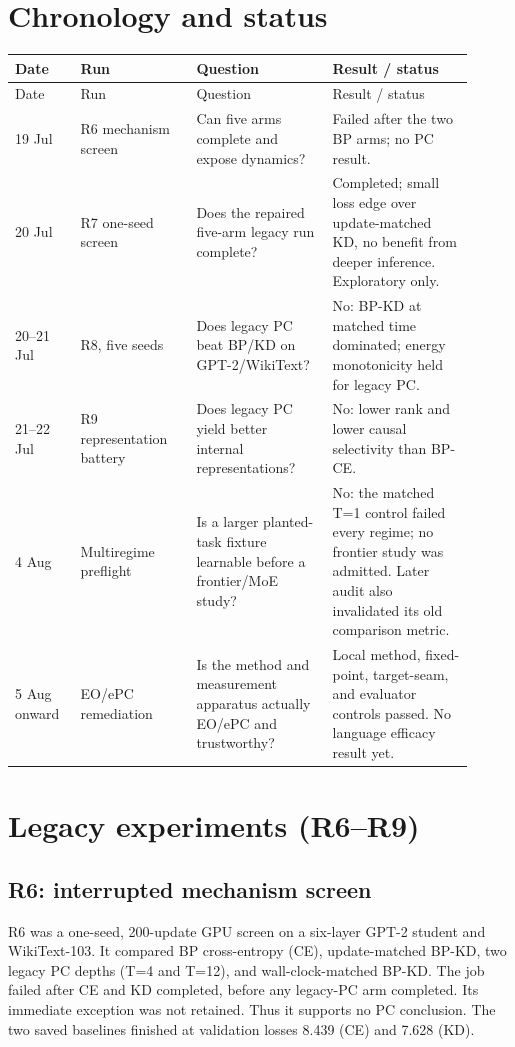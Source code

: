 \documentclass[10pt,a4paper]{article}
\begin{document}
\section{Chronology and status}
\begin{longtable}{p{0.13\linewidth}p{0.23\linewidth}p{0.27\linewidth}p{0.28\linewidth}}
\toprule
Date & Run & Question & Result / status \\
\midrule
\endfirsthead
\toprule Date & Run & Question & Result / status \\
\midrule
\endhead
19 Jul & R6 mechanism screen & Can five arms complete and expose dynamics? & Failed after the two BP arms; no PC result. \\
20 Jul & R7 one-seed screen & Does the repaired five-arm legacy run complete? & Completed; small loss edge over update-matched KD, no benefit from deeper inference. Exploratory only. \\
20--21 Jul & R8, five seeds & Does legacy PC beat BP/KD on GPT-2/WikiText? & No: BP-KD at matched time dominated; energy monotonicity held for legacy PC. \\
21--22 Jul & R9 representation battery & Does legacy PC yield better internal representations? & No: lower rank and lower causal selectivity than BP-CE. \\
4 Aug & Multiregime preflight & Is a larger planted-task fixture learnable before a frontier/MoE study? & No: the matched T=1 control failed every regime; no frontier study was admitted. Later audit also invalidated its old comparison metric. \\
5 Aug onward & EO/ePC remediation & Is the method and measurement apparatus actually EO/ePC and trustworthy? & Local method, fixed-point, target-seam, and evaluator controls passed. No language efficacy result yet. \\
\bottomrule
\end{longtable}

\section{Legacy experiments (R6--R9)}
\subsection{R6: interrupted mechanism screen}
R6 was a one-seed, 200-update GPU screen on a six-layer GPT-2 student and
WikiText-103.  It compared BP cross-entropy (CE), update-matched BP-KD, two
legacy PC depths (T=4 and T=12), and wall-clock-matched BP-KD.  The job failed
after CE and KD completed, before any legacy-PC arm completed.  Its immediate
exception was not retained.  Thus it supports no PC conclusion.  The two saved
baselines finished at validation losses 8.439 (CE) and 7.628 (KD).
\end{document}
